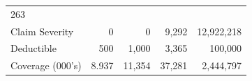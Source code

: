 \documentclass[]{book}
\theoremstyle{definition}
\theoremstyle{definition}
\theoremstyle{definition}
\theoremstyle{remark}
\begin{document}
\begin{longtable}[]{@{}lrrrr@{}}
\begin{minipage}[t]{0.14\columnwidth}
263\strut
\end{minipage}\tabularnewline
\begin{minipage}[t]{0.23\columnwidth}\raggedright\strut
Claim Severity\strut
\end{minipage} & \begin{minipage}[t]{0.12\columnwidth}\raggedleft\strut
0\strut
\end{minipage} & \begin{minipage}[t]{0.11\columnwidth}\raggedleft\strut
0\strut
\end{minipage} & \begin{minipage}[t]{0.12\columnwidth}\raggedleft\strut
9,292\strut
\end{minipage} & \begin{minipage}[t]{0.14\columnwidth}\raggedleft\strut
12,922,218\strut
\end{minipage}\tabularnewline
\begin{minipage}[t]{0.23\columnwidth}\raggedright\strut
Deductible\strut
\end{minipage} & \begin{minipage}[t]{0.12\columnwidth}\raggedleft\strut
500\strut
\end{minipage} & \begin{minipage}[t]{0.11\columnwidth}\raggedleft\strut
1,000\strut
\end{minipage} & \begin{minipage}[t]{0.12\columnwidth}\raggedleft\strut
3,365\strut
\end{minipage} & \begin{minipage}[t]{0.14\columnwidth}\raggedleft\strut
100,000\strut
\end{minipage}\tabularnewline
\begin{minipage}[t]{0.23\columnwidth}\raggedright\strut
Coverage (000's)\strut
\end{minipage} & \begin{minipage}[t]{0.12\columnwidth}\raggedleft\strut
8.937\strut
\end{minipage} & \begin{minipage}[t]{0.11\columnwidth}\raggedleft\strut
11,354\strut
\end{minipage} & \begin{minipage}[t]{0.12\columnwidth}\raggedleft\strut
37,281\strut
\end{minipage} & \begin{minipage}[t]{0.14\columnwidth}\raggedleft\strut
2,444,797\strut
\end{minipage}\tabularnewline
\bottomrule
\end{longtable}
\end{document}
